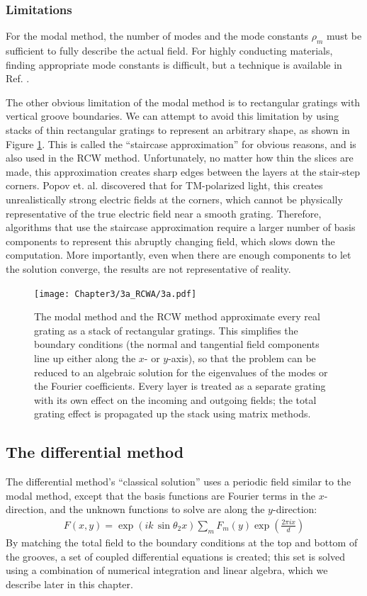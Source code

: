 \documentclass[singlespace,proposal]{uofsthesis-cs}
\begin{document}
\subsubsection{Limitations}
For the modal method, the number of modes and the mode constants $\rho_m$ must be sufficient to fully describe the actual field.  For highly conducting materials, finding appropriate mode constants is difficult, but a technique is available in Ref. \cite{And81}.  

The other obvious limitation of the modal method is to rectangular gratings with vertical groove boundaries.  We can attempt to avoid this limitation by using stacks of thin rectangular gratings to represent an arbitrary shape, as shown in Figure \ref{3a}.  This is called the ``staircase approximation'' for obvious reasons, and is also used in the RCW method.  Unfortunately, no matter how thin the slices are made, this approximation creates sharp edges between the layers at the stair-step corners.  Popov et. al. discovered that for TM-polarized light, this creates unrealistically strong electric fields at the corners, which cannot be physically representative of the true electric field near a smooth grating.  Therefore, algorithms that use the staircase approximation require a larger number of basis components to represent this abruptly changing field, which slows down the computation.  More importantly, even when there are enough components to let the solution converge, the results are not representative of reality. \cite{Pop02} 

\begin{figure}[tbp] %
   \centering
   \texttt{[image: Chapter3/3a\_RCWA/3a.pdf]} 
   \caption{The modal method and the RCW method approximate every real grating as a stack of rectangular gratings.  This simplifies the boundary conditions (the normal and tangential field components line up either along the $x$- or $y$-axis), so that the problem can be reduced to an algebraic solution for the eigenvalues of the modes or the Fourier coefficients.  Every layer is treated as a separate grating with its own effect on the incoming and outgoing fields; the total grating effect is propagated up the stack using matrix methods.}
   \label{3a}
\end{figure}

\subsection{The differential method}
The differential method's ``classical solution'' uses a periodic field similar to the modal method, except that the basis functions are Fourier terms in the $x$-direction, and the unknown functions to solve are along the $y$-direction:
\begin{eqnarray}
F(x,y)=\exp\left( ik\, \sin \theta_{2}x \right) \sum\limits_m F_m(y) \exp \left( \frac{2\pi i x}{d} \right)
\end{eqnarray}
By matching the total field to the boundary conditions at the top and bottom of the grooves, a set of coupled differential equations is created; this set is solved using a combination of numerical integration and linear algebra, which we describe later in this chapter.  
\end{document}
